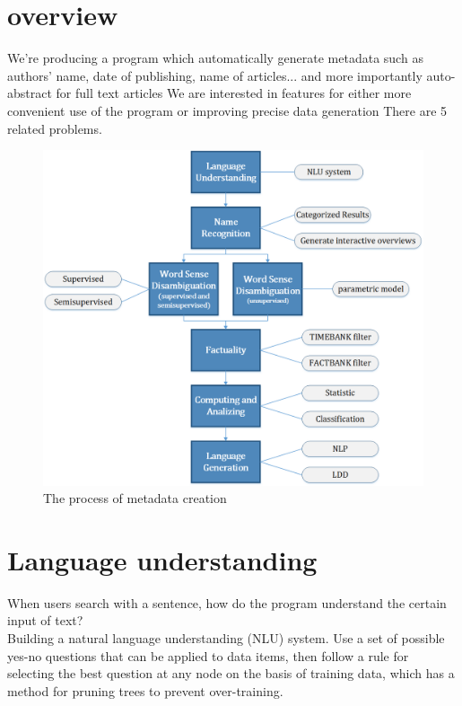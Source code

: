 \section*{overview}
\label{sec:prob}

We're producing a program which automatically generate metadata such as authors' name, date of publishing, name of articles... and more importantly auto-abstract for full text articles
We are interested in features for either more convenient use of the program or improving precise data generation
There are 5 related problems.\\
\begin{figure}
	\caption{The process of metadata creation}
\begin{center}
	\includegraphics[width=\columnwidth]{UnionChart}
\end{center}
\end{figure}

\section*{Language understanding}

When  users  search  with  a  sentence,  how  do  the  program  understand  the  certain  input  of  text? \\

Building  a  natural  language  understanding  (NLU)  system. Use  a  set  of  possible  yes-no  questions  that  can  be  applied  to  data  items,  then  follow  a  rule  for selecting  the  best  question  at  any  node  on  the  basis  of training  data,  which  has  a  method  for  pruning trees to prevent over-training.


